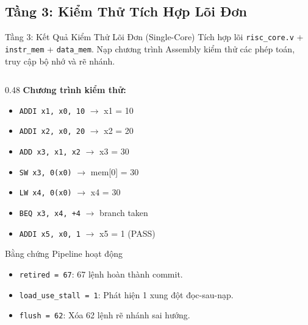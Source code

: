 \subsection{Tầng 3: Kiểm Thử Tích Hợp Lõi Đơn}

\begin{frame}[fragile]{Tầng 3: Kết Quả Kiểm Thử Lõi Đơn (Single-Core)}
    Tích hợp lõi \texttt{risc\_core.v} + \texttt{instr\_mem} + \texttt{data\_mem}. Nạp chương trình Assembly kiểm thử các phép toán, truy cập bộ nhớ và rẽ nhánh.
    \vspace{0.1cm}

    \begin{columns}[T]
        \begin{column}{0.48\textwidth}
            \textbf{Chương trình kiểm thử:}
            \begin{itemize}
                \scriptsize
                \item \texttt{ADDI x1, x0, 10} $\rightarrow$ x1 = 10
                \item \texttt{ADDI x2, x0, 20} $\rightarrow$ x2 = 20
                \item \texttt{ADD x3, x1, x2} $\rightarrow$ x3 = 30
                \item \texttt{SW x3, 0(x0)} $\rightarrow$ mem[0] = 30
                \item \texttt{LW x4, 0(x0)} $\rightarrow$ x4 = 30
                \item \texttt{BEQ x3, x4, +4} $\rightarrow$ branch taken
                \item \texttt{ADDI x5, x0, 1} $\rightarrow$ x5 = 1 (PASS)
            \end{itemize}
            \vspace{0.1cm}
            \begin{block}{Bằng chứng Pipeline hoạt động}
                \scriptsize
                \begin{itemize}
                    \item \texttt{retired = 67}: 67 lệnh hoàn thành commit.
                    \item \texttt{load\_use\_stall = 1}: Phát hiện 1 xung đột đọc-sau-nạp.
                    \item \texttt{flush = 62}: Xóa 62 lệnh rẽ nhánh sai hướng.
                \end{itemize}
            \end{block}
        \end{column}


\end{columns}
\end{frame}
